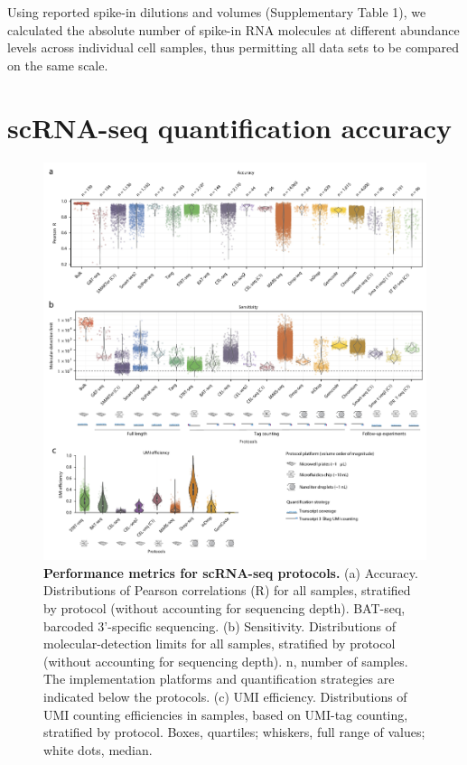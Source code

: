 Using reported spike-in dilutions and volumes (Supplementary Table 1), we calculated the absolute number of spike-in RNA molecules at different abundance levels across individual cell samples, thus permitting all data sets to be compared on the same scale.

\section{scRNA-seq quantification accuracy}

\begin{figure}
    \centering
    \centerline{\includegraphics[width=0.75\paperwidth]{"Figure 2"}}
    \caption[Performance metrics for scRNA-seq protocols]{\textbf{Performance metrics for scRNA-seq protocols.} (a) Accuracy. Distributions of Pearson correlations (R) for all samples, stratified by protocol (without accounting for sequencing depth). BAT-seq, barcoded 3'-specific sequencing. (b) Sensitivity. Distributions of molecular-detection limits for all samples, stratified by protocol (without accounting for sequencing depth). n, number of samples. The implementation platforms and quantification strategies are indicated below the protocols. (c) UMI efficiency. Distributions of UMI counting efficiencies in samples, based on UMI-tag counting, stratified by protocol. Boxes, quartiles; whiskers, full range of values; white dots, median.}
    \label{fig:performance}
\end{figure}

